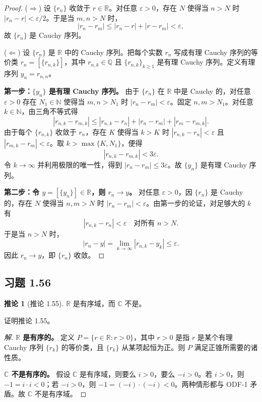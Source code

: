 \documentclass[11pt,a4paper]{article}
\newcommand{\R}{\mathbb{R}}
\newcommand{\C}{\mathbb{C}}
\newcommand{\Q}{\mathbb{Q}}
\newcommand{\N}{\mathbb{N}}
\theoremstyle{definition}
\newtheorem{corollary}[theorem]{推论}
\newenvironment{solution}{\begin{proof}[解]}{\end{proof}}
\begin{document}
\begin{proof}
($\Rightarrow$) 设 $\{r_n\}$ 收敛于 $r \in \R$。对任意 $\varepsilon > 0$，存在 $N$ 使得当 $n > N$ 时 $|r_n - r| < \varepsilon/2$。于是当 $m, n > N$ 时，
\[
  |r_n - r_m| \le |r_n - r| + |r - r_m| < \varepsilon,
\]
故 $\{r_n\}$ 是 Cauchy 序列。

($\Leftarrow$) 设 $\{r_n\}$ 是 $\R$ 中的 Cauchy 序列。把每个实数 $r_n$ 写成有理 Cauchy 序列的等价类 $r_n = [\{r_{n,k}\}]$，其中 $r_{n,k} \in \Q$ 且 $\{r_{n,k}\}_{k\ge1}$ 是有理 Cauchy 序列。定义有理序列 $y_n = r_{n,n}$。

\textbf{第一步：$\{y_n\}$ 是有理 Cauchy 序列。} 由于 $\{r_n\}$ 在 $\R$ 中是 Cauchy 的，对任意 $\varepsilon > 0$ 存在 $N_1 \in \N$ 使得当 $m, n > N_1$ 时 $|r_n - r_m| < \varepsilon$。固定 $n, m > N_1$。对任意 $k \in \N$，由三角不等式得
\[
  |r_{n,k} - r_{m,k}| \le |r_{n,k} - r_n| + |r_n - r_m| + |r_m - r_{m,k}|.
\]
由于每个 $\{r_{n,k}\}$ 收敛于 $r_n$，存在 $K$ 使得当 $k > K$ 时 $|r_{n,k} - r_n| < \varepsilon$ 且 $|r_{m,k} - r_m| < \varepsilon$。取 $k > \max\{K, N_1\}$，便得
\[
  |r_{n,k} - r_{m,k}| < 3\varepsilon.
\]
令 $k \to \infty$ 并利用极限的唯一性，得到 $|r_n - r_m| \le 3\varepsilon$。故 $\{y_n\}$ 是有理 Cauchy 序列。

\textbf{第二步：令 $y = [\{y_n\}] \in \R$，则 $r_n \to y$。} 对任意 $\varepsilon > 0$，因 $\{r_n\}$ 是 Cauchy 的，存在 $N$ 使得当 $n, m > N$ 时 $|r_n - r_m| < \varepsilon$。由第一步的论证，对足够大的 $k$ 有
\[
  |r_{n,k} - r_n| < \varepsilon \quad \text{对所有 } n > N.
\]
于是当 $n > N$ 时，
\[
  |r_n - y| = \lim_{k\to\infty} |r_{n,k} - y_k| \le \varepsilon.
\]
因此 $r_n \to y$，即 $\{r_n\}$ 收敛。
\end{proof}

\subsection{习题 1.56}

\begin{corollary}[推论 1.55]
  $\mathbb{R}$ 是有序域，而 $\mathbb{C}$ 不是。
\end{corollary}

证明推论 1.55。

\begin{solution}
\textbf{$\R$ 是有序的。} 定义 $P = \{r \in \R : r > 0\}$，其中 $r > 0$ 是指 $r$ 是某个有理 Cauchy 序列 $\{r_k\}$ 的等价类，且 $\{r_k\}$ 从某项起恒为正。则 $P$ 满足正锥所需要的诸性质。

\textbf{$\C$ 不是有序的。} 假设 $\C$ 是有序域，则要么 $i > 0$，要么 $-i > 0$。若 $i > 0$，则 $-1 = i \cdot i < 0$；若 $-i > 0$，则 $-1 = (-i) \cdot (-i) < 0$。两种情形都与 ODF-1 矛盾。故 $\C$ 不是有序域。
\end{solution}
\end{document}
